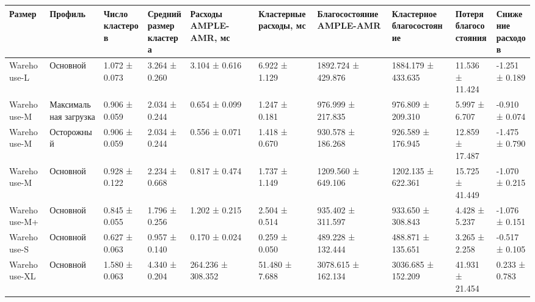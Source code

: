 \begin{tabular}{llllllllll}
\toprule
 Размер & Профиль & Число кластеров & \shortstack{Средний размер\\кластера} & Расходы AMPLE-AMR, мс & Кластерные расходы, мс & Благосостояние AMPLE-AMR & Кластерное благосостояние & \shortstack{Потеря\\благосостояния} & \shortstack{Снижение\\расходов} \\
\midrule
 Warehouse-L & Основной & 1.072 ± 0.073 & 3.264 ± 0.260 & 3.104 ± 0.616 & 6.922 ± 1.129 & 1892.724 ± 429.876 & 1884.179 ± 433.635 & 11.536 ± 11.424 & -1.251 ± 0.189 \\
 Warehouse-M & Максимальная загрузка & 0.906 ± 0.059 & 2.034 ± 0.244 & 0.654 ± 0.099 & 1.247 ± 0.181 & 976.999 ± 217.835 & 976.809 ± 209.310 & 5.997 ± 6.707 & -0.910 ± 0.074 \\
 Warehouse-M & Осторожный & 0.906 ± 0.059 & 2.034 ± 0.244 & 0.556 ± 0.071 & 1.418 ± 0.670 & 930.578 ± 186.268 & 926.589 ± 176.945 & 12.859 ± 17.487 & -1.475 ± 0.790 \\
 Warehouse-M & Основной & 0.928 ± 0.122 & 2.234 ± 0.668 & 0.817 ± 0.474 & 1.737 ± 1.149 & 1209.560 ± 649.106 & 1202.135 ± 622.361 & 15.725 ± 41.449 & -1.070 ± 0.215 \\
 Warehouse-M+ & Основной & 0.845 ± 0.055 & 1.796 ± 0.256 & 1.202 ± 0.215 & 2.504 ± 0.514 & 935.402 ± 311.597 & 933.650 ± 308.843 & 4.428 ± 5.237 & -1.076 ± 0.151 \\
 Warehouse-S & Основной & 0.627 ± 0.063 & 0.957 ± 0.140 & 0.170 ± 0.024 & 0.259 ± 0.050 & 489.228 ± 132.444 & 488.871 ± 135.651 & 3.265 ± 2.258 & -0.517 ± 0.105 \\
 Warehouse-XL & Основной & 1.580 ± 0.063 & 4.340 ± 0.204 & 264.236 ± 308.352 & 51.480 ± 7.688 & 3078.615 ± 162.134 & 3036.685 ± 152.209 & 41.931 ± 21.454 & 0.233 ± 0.783 \\
\bottomrule
\end{tabular}
